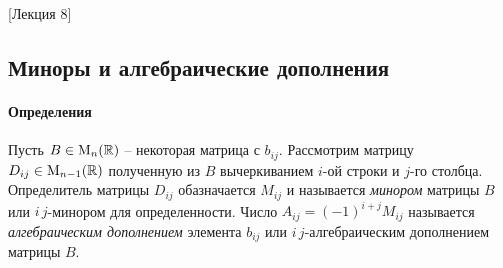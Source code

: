[Лекция 8]


\subsection{Миноры и алгебраические дополнения}

\paragraph{Определения}

Пусть $B\in\operatorname{M}_{n}(\mathbb R)$ -- некоторая матрица с $b_{ij}$.
Рассмотрим матрицу $D_{ij}\in\operatorname{M}_{n-1}(\mathbb R)$ полученную из $B$ вычеркиванием $i$-ой строки и $j$-го столбца.
Определитель матрицы $D_{ij}$ обазначается $M_{ij}$ и называется {\it минором} матрицы $B$ или $i\,j$-минором для определенности.
Число $A_{ij} = (-1)^{i+j}M_{ij}$ называется {\it алгебраическим дополнением} элемента $b_{ij}$ или $i\,j$-алгебраическим дополнением матрицы $B$.


